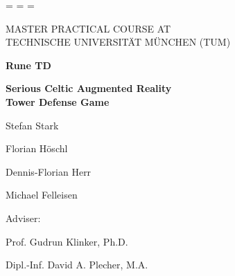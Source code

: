 \documentclass[headsepline,footsepline,footinclude=false,oneside,fontsize=11pt,paper=a4,listof=totoc,bibliography=totoc]{scrbook}
\begin{document}
\begin{titlepage}
  \oddsidemargin=\evensidemargin\relax
  \textwidth=\dimexpr{}\evensidemargin-2in\relax
  \hsize=\textwidth\relax

  \centering

  {\Large\MakeUppercase {Master Practical Course at}} \\
  {\Large\MakeUppercase {Technische Universität München (TUM)}}

  \vspace{35mm}
  {\Huge\bfseries Rune TD}
  
  \vspace{10mm}
  {\LARGE\bfseries Serious Celtic Augmented Reality} \\
  {\LARGE\bfseries Tower Defense Game}

  \vspace{30mm}
  {\LARGE Stefan Stark}
  
  \vspace{5mm}
  {\LARGE Florian Höschl}
  
  \vspace{5mm}
  {\LARGE Dennis-Florian Herr}
  
  \vspace{5mm}
  {\LARGE Michael Felleisen}
  
  \vspace{20mm}
  {\LARGE Adviser:}
  
  \vspace{5mm}
  {\LARGE Prof. Gudrun Klinker, Ph.D.}
  
  \vspace{5mm}
  {\LARGE Dipl.-Inf. David A. Plecher, M.A.}

  \vspace{20mm}

\end{titlepage}

\frontmatter{}

%


\mainmatter{}


%
%
%



%
%

\appendix{}
%

\printbibliography{}
\end{document}
